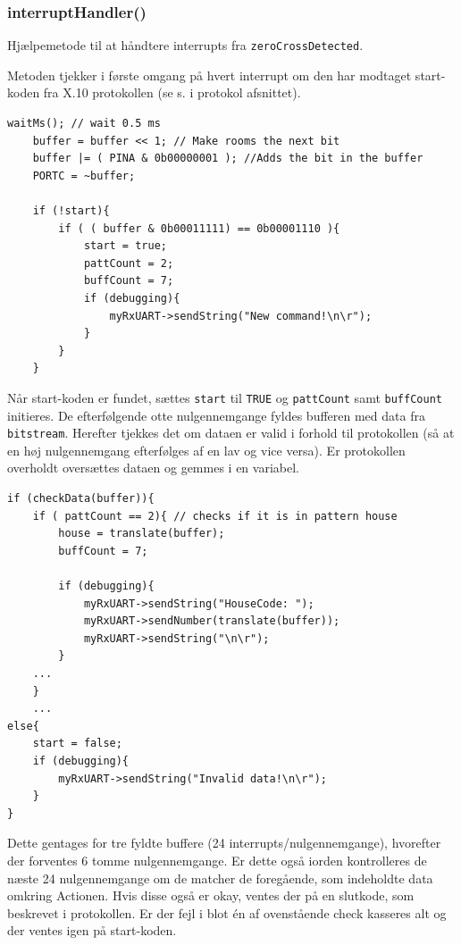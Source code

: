 \subsubsection{interruptHandler()}

Hjælpemetode til at håndtere interrupts fra \texttt{zeroCrossDetected}.

Metoden tjekker i første omgang på hvert interrupt om den har modtaget start-koden fra X.10 protokollen (se s. \pageref{prot_x10} i protokol afsnittet). 

\begin{lstlisting}[caption=Der ventes 0.5 ms og der tjekkes efter startbit.]
	waitMs(); // wait 0.5 ms
	buffer = buffer << 1; // Make rooms the next bit
	buffer |= ( PINA & 0b00000001 ); //Adds the bit in the buffer
	PORTC = ~buffer;

	if (!start){
		if ( ( buffer & 0b00011111) == 0b00001110 ){
			start = true;
			pattCount = 2;
			buffCount = 7;
			if (debugging){
				myRxUART->sendString("New command!\n\r");
			}
		}
	}
\end{lstlisting}

Når start-koden er fundet, sættes \texttt{start} til \texttt{TRUE} og \texttt{pattCount} samt \texttt{buffCount} initieres. 
De efterfølgende otte nulgennemgange fyldes bufferen med data fra \texttt{bitstream}.
Herefter tjekkes det om dataen er valid i forhold til protokollen (så at en høj nulgennemgang efterfølges af en lav og vice versa).
Er protokollen overholdt oversættes dataen og gemmes i en variabel.

\begin{lstlisting}
if (checkData(buffer)){
	if ( pattCount == 2){ // checks if it is in pattern house
		house = translate(buffer);
		buffCount = 7;
			
		if (debugging){
			myRxUART->sendString("HouseCode: ");
			myRxUART->sendNumber(translate(buffer));
			myRxUART->sendString("\n\r");
		}
	...		
	}
	...
else{
	start = false;
	if (debugging){
		myRxUART->sendString("Invalid data!\n\r");	
	}	
}				
\end{lstlisting}

Dette gentages for tre fyldte buffere (24 interrupts/nulgennemgange), hvorefter der forventes 6 tomme nulgennemgange.
Er dette også iorden kontrolleres de næste 24 nulgennemgange om de matcher de foregående, som indeholdte data omkring Actionen.
Hvis disse også er okay, ventes der på en slutkode, som beskrevet i protokollen.
Er der fejl i blot én af ovenstående check kasseres alt og der ventes igen på start-koden.

